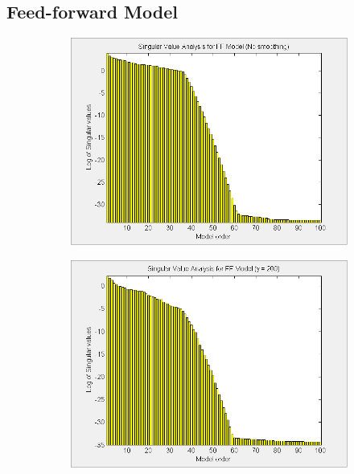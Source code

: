 \begin{landscape}
\section{Feed-forward Model}

\begin{figure}[H]
\centering
\begin{subfigure}[b]{0.38\textwidth}
\includegraphics[width=1.0\textwidth]{pics/SVD_FF_inf}

\label{pic:}
\end{subfigure}\;\begin{subfigure}[b]{0.38\textwidth}
\includegraphics[width=1.0\textwidth]{pics/SVD_FF_200}


\end{subfigure}
\end{figure}
\end{landscape}
